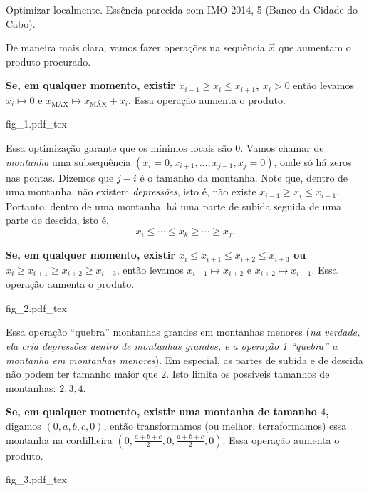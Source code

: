 \documentclass[10pt,a4paper]{article}
\begin{document}
	\begin{sk}
		Optimizar localmente. Essência parecida com IMO 2014, 5 (Banco da Cidade do Cabo).
		
		De maneira mais clara, vamos fazer operações na sequência $\vec{x}$ que aumentam o produto procurado.


		\textbf{\boldmath Se, em qualquer momento, existir $x_{i-1} \ge x_i \le x_{i+1}$, $x_i > 0$} então levamos $x_i \mapsto 0$ e $x_\text{MÁX} \mapsto x_\text{MÁX} + x_i$. Essa operação aumenta o produto.
		
		\begin{center}\def\svgwidth{8cm}{fig_1.pdf_tex}\end{center}

		Essa optimização garante que os mínimos locais são $0$. Vamos chamar de \emph{montanha} uma subsequência $(x_i = 0, x_{i+1}, \dots, x_{j-1}, x_j = 0)$, onde só há zeros nas pontas. Dizemos que $j - i$ é o tamanho da montanha. Note que, dentro de uma montanha, não existem \emph{depressões}, isto é, não existe $x_{i-1} \ge x_i \le x_{i+1}$. Portanto, dentro de uma montanha, há uma parte de subida seguida de uma parte de descida, isto é, \[
			x_i \le \cdots \le x_k \ge \cdots \ge x_j.
		\]

		\textbf{\boldmath Se, em qualquer momento, existir $x_{i} \le x_{i+1} \le x_{i+2} \le x_{i+3}$ ou $x_{i} \ge x_{i+1} \ge x_{i+2} \ge x_{i+3}$}, então levamos $x_{i+1} \mapsto x_{i+2}$ e $x_{i+2} \mapsto x_{i+1}$. Essa operação aumenta o produto.
		
		\begin{center}\def\svgwidth{8cm}{fig_2.pdf_tex}\end{center}

		Essa operação ``quebra'' montanhas grandes em montanhas menores (\emph{na verdade, ela cria depressões dentro de montanhas grandes, e a operação 1 ``quebra'' a montanha em montanhas menores}). Em especial, as partes de subida e de descida não podem ter tamanho maior que $2$. Isto limita os possíveis tamanhos de montanhas:  $2, 3, 4$.

		\textbf{\boldmath Se, em qualquer momento, existir uma montanha de tamanho $4$,} digamos $(0, a, b, c, 0)$, então transformamos (ou melhor, terraformamos) essa montanha na cordilheira $(0, \frac{a+b+c}{2}, 0, \frac{a+b+c}{2}, 0)$. Essa operação aumenta o produto.
		
		\begin{center}\def\svgwidth{8cm}{fig_3.pdf_tex}\end{center}


\end{sk}
\end{document}
